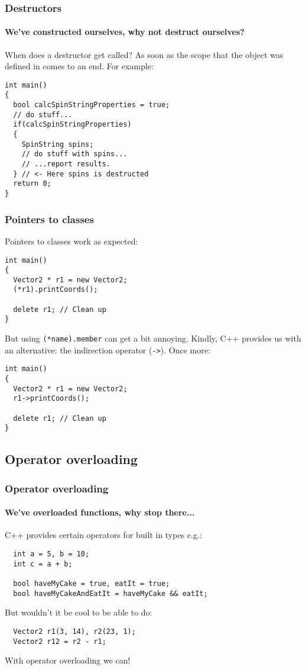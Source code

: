 \documentclass{beamer}
\begin{document}
\begin{frame}[fragile]
  \frametitle{Destructors}
  \framesubtitle{We've constructed ourselves, why not destruct ourselves?}
  When does a destructor get called?  As soon as the scope that the object was defined in comes to an end.
  \newline\pause
  For example:
  \begin{lstlisting}
int main()
{
  bool calcSpinStringProperties = true;
  // do stuff...
  if(calcSpinStringProperties)
  {
    SpinString spins;
    // do stuff with spins...
    // ...report results.
  } // <- Here spins is destructed
  return 0;
}
  \end{lstlisting}
  \pause
\end{frame}

\begin{frame}[fragile]
  \frametitle{Pointers to classes}
  
  Pointers to classes work as expected:
  \begin{lstlisting}
int main()
{
  Vector2 * r1 = new Vector2;
  (*r1).printCoords();
  
  delete r1; // Clean up
}
  \end{lstlisting}
  \pause
  But using \texttt{(*name).member} can get a bit annoying.  Kindly, C++ provides us with an alternative: the indirection operator (\texttt{->}).\pause{}  Once more:
  \begin{lstlisting}
int main()
{
  Vector2 * r1 = new Vector2;
  r1->printCoords();
  
  delete r1; // Clean up
}  
  \end{lstlisting}

\end{frame}

\subsection{Operator overloading}

\begin{frame}[fragile]
  \frametitle{Operator overloading}
  \framesubtitle{We've overloaded functions, why stop there...}
  
  C++ provides certain operators for built in types e.g.:
  \begin{lstlisting}
  int a = 5, b = 10;
  int c = a + b;
  
  bool haveMyCake = true, eatIt = true;
  bool haveMyCakeAndEatIt = haveMyCake && eatIt;
  \end{lstlisting}
  But wouldn't it be cool to be able to do:
  \begin{lstlisting}
  Vector2 r1(3, 14), r2(23, 1);
  Vector2 r12 = r2 - r1;
  \end{lstlisting}
  With operator overloading we can!

\end{frame}
\end{document}
